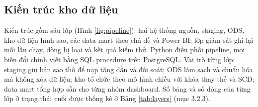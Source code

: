 \subsection{Kiến trúc kho dữ liệu}
Kiến trúc gồm sáu lớp (Hình \ref{fig:pipeline}): hai hệ thống nguồn, staging, ODS, kho dữ liệu hình sao, các data mart theo chủ đề và Power BI; lớp giám sát  ghi lại mỗi lần chạy, dòng bị loại và kết quả kiểm thử. Python điều phối pipeline, mọi biến đổi chính viết bằng SQL procedure trên PostgreSQL. Vai trò từng lớp: staging giữ bản sao thô để nạp tăng dần và đối soát; ODS làm sạch và chuẩn hóa mà không xóa dữ liệu; kho tổ chức theo mô hình chiều với khóa thay thế và SCD; data mart tổng hợp sẵn cho từng nhóm dashboard.
Số bảng và số dòng của từng lớp ở trạng thái cuối được thống kê ở Bảng \ref{tab:layers} (mục 3.2.3).
